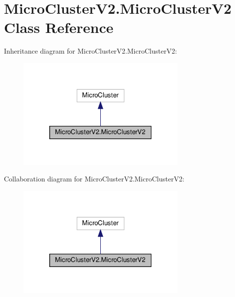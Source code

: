 \hypertarget{classMicroClusterV2_1_1MicroClusterV2}{}\section{Micro\+Cluster\+V2.\+Micro\+Cluster\+V2 Class Reference}
\label{classMicroClusterV2_1_1MicroClusterV2}


Inheritance diagram for Micro\+Cluster\+V2.\+Micro\+Cluster\+V2\+:
\nopagebreak
\begin{figure}[H]
\begin{center}
\leavevmode
\includegraphics[width=235pt]{classMicroClusterV2_1_1MicroClusterV2__inherit__graph}
\end{center}
\end{figure}


Collaboration diagram for Micro\+Cluster\+V2.\+Micro\+Cluster\+V2\+:
\nopagebreak
\begin{figure}[H]
\begin{center}
\leavevmode
\includegraphics[width=235pt]{classMicroClusterV2_1_1MicroClusterV2__coll__graph}
\end{center}
\end{figure}
